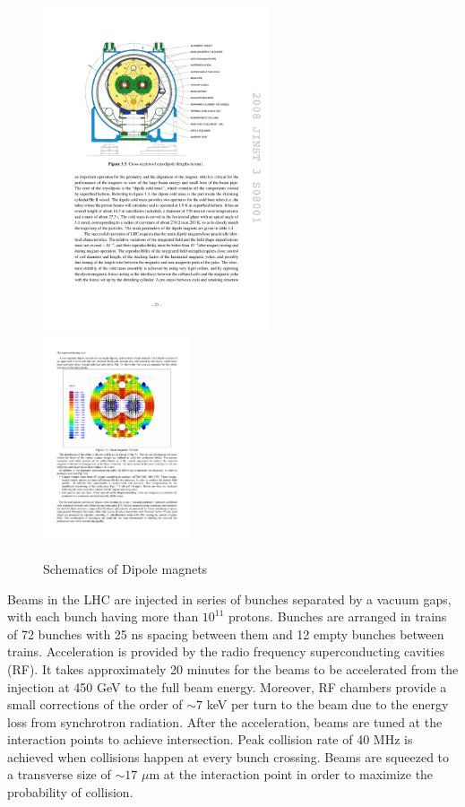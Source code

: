 \begin{figure}[htbp]
	\centering
  		\includegraphics[width=0.6\textwidth]{Figures/LHC_magnet.pdf}
  		\includegraphics[width=0.39\textwidth]{Figures/LHC_MagVec.pdf}
	\caption[Schematics of dipole magnets]{Schematics of Dipole magnets \cite{Evans:2008zzb, Bruning:782076}}
	\label{fig:LHC_mag}
\end{figure}
 
\par Beams in the LHC are injected in series of bunches separated by a vacuum gaps, with each bunch having more than $10^{11}$ protons. Bunches are arranged in trains of 72 bunches with 25 ns spacing between them and 12 empty bunches between trains. Acceleration is provided by the radio frequency superconducting cavities (RF). It takes approximately 20 minutes for the beams to be accelerated from the injection at 450 GeV to the full beam energy. Moreover, RF chambers provide a small corrections of the order of $\sim 7$ keV per turn to the beam due to the energy loss from synchrotron radiation. After the acceleration, beams are tuned at the interaction points to achieve intersection. Peak collision rate of 40 MHz is achieved when collisions happen at every bunch crossing. Beams are squeezed to a transverse size of $\sim 17$ $\mu$m at the interaction point in order to maximize the probability of collision.  
    

